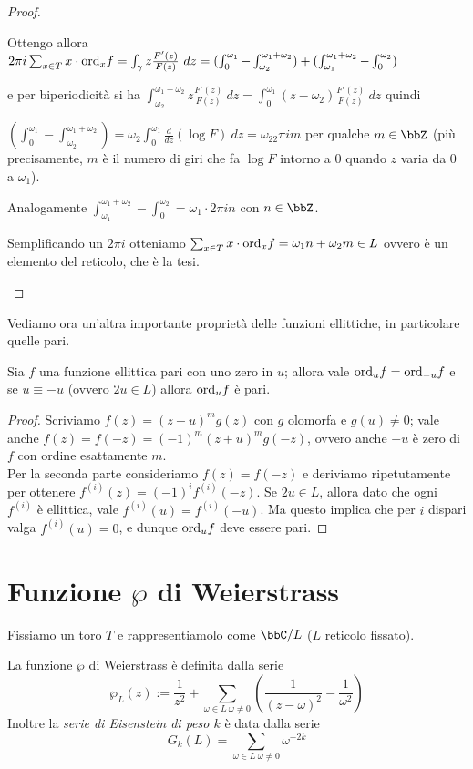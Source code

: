 \begin{proof}
\begin{enumerate}
    Ottengo allora $2\pi i\sum_{x\in T}x\cdot\ord_xf=\int_\gamma z\frac{F'(z)}{F(z)}\ dz=(\int_0^{\omega_1}-\int_{\omega_2}^{\omega_1+\omega_2})+(\int_{\omega_1}^{\omega_1+\omega_2}-\int_{0}^{\omega_2})$

    e per biperiodicità si ha $\int_{\omega_2}^{\omega_1+\omega_2}z\frac{F'(z)}{F(z)}\ dz=\int_0^{\omega_1}(z-\omega_2)\frac{F'(z)}{F(z)}\ dz$ quindi

    $(\int_0^{\omega_1}-\int_{\omega_2}^{\omega_1+\omega_2})=\omega_2\int_0^{\omega_1}\frac{d}{dz}(\log F)\ dz=\omega_22\pi i m$ per qualche $m\in\bbZ$
    (più precisamente, $m$ è il numero di giri che fa $\log F$ intorno a $0$ quando $z$ varia da $0$ a $\omega_1$).

    Analogamente $\int_{\omega_1}^{\omega_1+\omega_2}-\int_{0}^{\omega_2}=\omega_1\cdot 2\pi i n$ con $n\in\bbZ$.

    Semplificando un $2\pi i$ otteniamo $\sum_{x\in T}x\cdot\text{ord}_xf=\omega_1n+\omega_2m\in L$ ovvero è un elemento del reticolo, che è la tesi.
\end{enumerate}
\end{proof}

Vediamo ora un'altra importante proprietà delle funzioni ellittiche, in particolare quelle pari.
\begin{proposizione}\label{fell-pari}
    Sia $f$ una funzione ellittica pari con uno zero in $u$; allora vale $\text{ord}_uf=\text{ord}_{-u}f$ e se $u\equiv-u$ (ovvero $2u\in L$) allora $\text{ord}_u f$ è pari.
\end{proposizione}
\begin{proof}
    Scriviamo $f(z)=(z-u)^mg(z)$ con $g$ olomorfa e $g(u)\neq0$; vale anche $f(z)=f(-z)=(-1)^m(z+u)^mg(-z)$, ovvero anche $-u$ è zero di $f$ con ordine esattamente $m$.\\
    Per la seconda parte consideriamo $f(z)=f(-z)$ e deriviamo ripetutamente per ottenere $f^{(i)}(z)=(-1)^if^{(i)}(-z)$. Se $2u\in L$, allora dato che ogni $f^{(i)}$ è ellittica, vale $f^{(i)}(u)=f^{(i)}(-u)$. Ma questo implica che per $i$ dispari valga $f^{(i)}(u)=0$, e dunque $\text{ord}_u f$ deve essere pari.
\end{proof}


\section{Funzione $\wp$ di Weierstrass}


Fissiamo un toro $T$ e rappresentiamolo come $\bbC/L$ ($L$ reticolo fissato).
\begin{definizione}
    La funzione $\wp$ di Weierstrass è definita dalla serie $$\wp_L(z):=\frac{1}{z^2}+\sum_{\omega\in L\ \omega\not=0}(\frac{1}{(z-\omega)^2}-\frac{1}{\omega^2})$$
    Inoltre la \emph{serie di Eisenstein di peso $k$} è data dalla serie $$G_k(L)=\sum_{\omega\in L\ \omega\not=0}\omega^{-2k}$$
\end{definizione}


